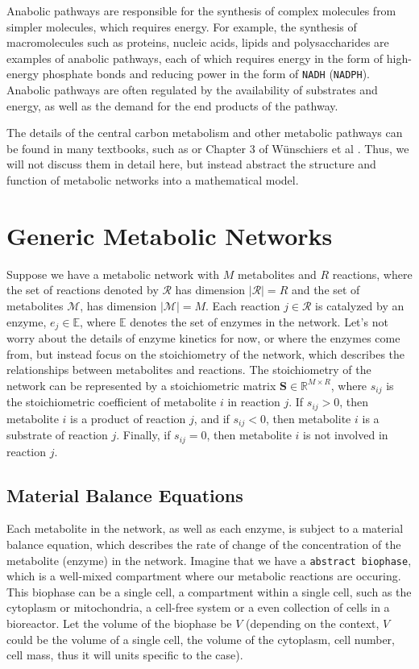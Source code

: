 \documentclass{article}[12pt]
\def\R{\mathbb{R}}
\def\E{\mathbb{E}}
\begin{document}
Anabolic pathways are responsible for the synthesis of complex molecules from simpler molecules, which requires energy.
For example, the synthesis of macromolecules such as proteins, nucleic acids, lipids and polysaccharides are examples of anabolic pathways, 
each of which requires energy in the form of high-energy phosphate bonds and reducing power in the form of \texttt{NADH} (\texttt{NADPH}).
Anabolic pathways are often regulated by the availability of substrates and energy, as well as the demand for the end products of the pathway.

The details of the central carbon metabolism and other metabolic pathways can be found in many textbooks, such as \cite{Palsson2015} or Chapter 3 of Wünschiers et al \cite{Metabolism}.
Thus, we will not discuss them in detail here, but instead abstract the structure and function of metabolic networks into a mathematical model.

\section{Generic Metabolic Networks}
Suppose we have a metabolic network with $M$ metabolites and $R$ reactions, where the set of reactions denoted by $\mathcal{R}$ has dimension $|\mathcal{R}|=R$ and the set of metabolites $\mathcal{M}$, has dimension $|\mathcal{M}|=M$.
Each reaction $j \in \mathcal{R}$ is catalyzed by an enzyme, $e_{j}\in\E$, where $\E$ denotes the set of enzymes in the network. 
Let's not worry about the details of enzyme kinetics for now, or where the enzymes come from, but instead focus on the stoichiometry of the network, which describes the relationships between metabolites and reactions.
The stoichiometry of the network can be represented by a stoichiometric matrix $\mathbf{S} \in \R^{M \times R}$, where $s_{ij}$ is the stoichiometric coefficient of metabolite $i$ in reaction $j$.
If $s_{ij} > 0$, then metabolite $i$ is a product of reaction $j$, and if $s_{ij} < 0$, then metabolite $i$ is a substrate of reaction $j$.
Finally, if $s_{ij} = 0$, then metabolite $i$ is not involved in reaction $j$. 

\subsection{Material Balance Equations}
Each metabolite in the network, as well as each enzyme, is subject to a material balance equation, which describes the rate of change of the concentration of the metabolite (enzyme) in the network.
Imagine that we have a \texttt{abstract biophase}, which is a well-mixed compartment where our metabolic reactions are occuring.
This biophase can be a single cell, a compartment within a single cell, such as the cytoplasm or mitochondria, a cell-free system or a even collection of cells in 
a bioreactor. Let the volume of the biophase be $V$ (depending on the context, $V$ could be the volume of a single cell, the volume of the cytoplasm, cell number, cell mass, thus it will units specific to the case).\
\end{document}
